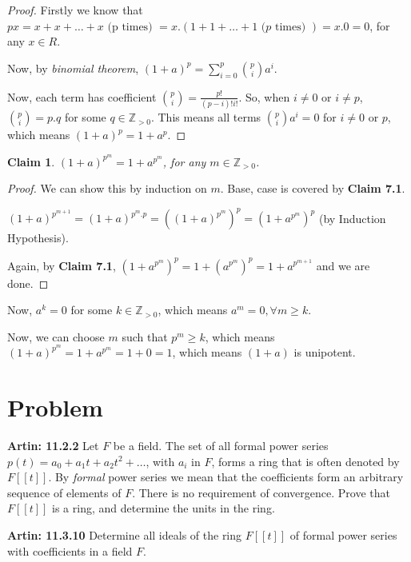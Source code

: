 \documentclass[12pt,a4paper]{article}
\newtheorem{claim}[theorem]{Claim}
\theoremstyle{definition}
\begin{document}
\begin{flushleft}
\begin{proof}
	Firstly we know that $px = x + x + \dots +x \text{ (p times) } = x.(1 + 1 + \dots +1 \text{ ($p$ times) }) = x.0 = 0$, for any $x \in R$.

	Now, by {\it binomial theorem}, $(1+a)^p = \sum_{i=0}^{p} \binom{p}{i}a^i$.

	\medskip

	Now, each term has coefficient $\binom{p}{i} = \frac{p!}{(p-i)!i!}$. So, when $i \ne 0$ or $i \ne p$, $\binom{p}{i} = p.q$ for some $q \in \mathbb{Z}_{>0}$. This means all terms $\binom{p}{i}a^i = 0$ for $i \ne 0 \text{ or } p$, which means $(1+a)^p = 1 + a^p$.
\end{proof}

\begin{claim}
	$(1+a)^{p^m} = 1 + a^{p^m}$, for any $m \in \mathbb{Z}_{>0}$.
\end{claim}

\begin{proof}
	We can show this by induction on $m$. Base, case is covered by {\bf Claim 7.1}.

	$(1 +a)^{p^{m+1}} = (1+a)^{p^m.p} = ((1+a)^{p^m})^p = (1+ a^{p^m})^p$ (by Induction Hypothesis).

	Again, by {\bf Claim 7.1}, $(1+ a^{p^m})^p = 1 + (a^{p^m})^p = 1 + a^{p^{m+1}}$ and we are done.
\end{proof}

Now, $a^k = 0$ for some $k \in \mathbb{Z}_{>0}$, which means $a^m = 0, \forall m \ge k$.

Now, we can choose $m$ such that $p^m \ge k$, which means $(1+a)^{p^m} = 1 + a^{p^m} = 1 + 0 = 1$, which means $(1+a)$ is unipotent.

\newpage

\setcounter{section}{7}
\section{Problem}

{\bf Artin: 11.2.2} Let $F$ be a field. The set of all formal power series $p(t) = a_0 + a_1 t + a_2 t^2 + \dots$, with $a_i$ in $F$, forms a ring that is often denoted by $F[[t]]$. By {\it formal} power series we mean that the coefficients form an arbitrary sequence of elements of $F$. There is no requirement of convergence. Prove that $F[[t]]$ is a ring, and determine the units in the ring.

\medskip

{\bf Artin: 11.3.10} Determine all ideals of the ring $F[[t]]$ of formal power series with coefficients in a field $F$.


\end{flushleft}
\end{document}
